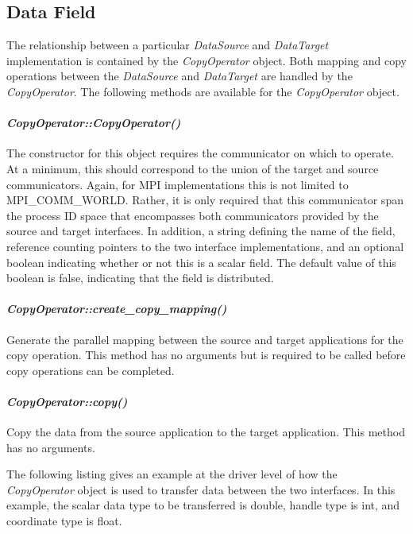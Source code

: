 \documentclass[letterpaper]{article}
\begin{document}
\subsection{Data Field}
The relationship between a particular {\sl DataSource} and {\sl
  DataTarget} implementation is contained by the {\sl CopyOperator}
object. Both mapping and copy operations between the {\sl DataSource}
and {\sl DataTarget} are handled by the {\sl CopyOperator}. The
following methods are available for the {\sl CopyOperator} object.

\paragraph{\sl CopyOperator::CopyOperator()}
The constructor for this object requires the communicator on which to
operate. At a minimum, this should correspond to the union of the
target and source communicators. Again, for MPI implementations this
is not limited to MPI\_COMM\_WORLD. Rather, it is only required that
this communicator span the process ID space that encompasses both
communicators provided by the source and target interfaces. In
addition, a string defining the name of the field, reference counting
pointers to the two interface implementations, and an optional boolean
indicating whether or not this is a scalar field. The default value of
this boolean is false, indicating that the field is distributed.

\paragraph{\sl CopyOperator::create\_copy\_mapping()}
Generate the parallel mapping between the source and target
applications for the copy operation. This method has no arguments but
is required to be called before copy operations can be completed.

\paragraph{\sl CopyOperator::copy()}
Copy the data from the source application to the target
application. This method has no arguments.

The following listing gives an example at the driver level of how the
{\sl CopyOperator} object is used to transfer data between the two
interfaces. In this example, the scalar data type to be transferred is
double, handle type is int, and coordinate type is float.
\end{document}
